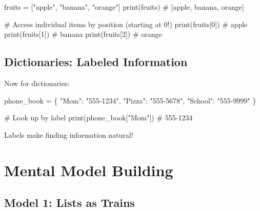 \documentclass[
  letterpaper,
  DIV=11,
  numbers=noendperiod,
  oneside]{scrreprt}
\newenvironment{Shaded}{}{}
\newcommand{\BuiltInTok}[1]{\textcolor[rgb]{0.84,0.23,0.29}{#1}}
\newcommand{\CommentTok}[1]{\textcolor[rgb]{0.42,0.45,0.49}{#1}}
\newcommand{\DecValTok}[1]{\textcolor[rgb]{0.00,0.36,0.77}{#1}}
\newcommand{\NormalTok}[1]{\textcolor[rgb]{0.14,0.16,0.18}{#1}}
\newcommand{\OperatorTok}[1]{\textcolor[rgb]{0.14,0.16,0.18}{#1}}
\newcommand{\StringTok}[1]{\textcolor[rgb]{0.01,0.18,0.38}{#1}}
\begin{document}
\begin{Shaded}
\begin{Highlighting}[]
\NormalTok{fruits }\OperatorTok{=}\NormalTok{ [}\StringTok{"apple"}\NormalTok{, }\StringTok{"banana"}\NormalTok{, }\StringTok{"orange"}\NormalTok{]}
\BuiltInTok{print}\NormalTok{(fruits)  }\CommentTok{\# [\textquotesingle{}apple\textquotesingle{}, \textquotesingle{}banana\textquotesingle{}, \textquotesingle{}orange\textquotesingle{}]}

\CommentTok{\# Access individual items by position (starting at 0!)}
\BuiltInTok{print}\NormalTok{(fruits[}\DecValTok{0}\NormalTok{])  }\CommentTok{\# apple}
\BuiltInTok{print}\NormalTok{(fruits[}\DecValTok{1}\NormalTok{])  }\CommentTok{\# banana}
\BuiltInTok{print}\NormalTok{(fruits[}\DecValTok{2}\NormalTok{])  }\CommentTok{\# orange}
\end{Highlighting}
\end{Shaded}

\subsection{Dictionaries: Labeled
Information}\label{dictionaries-labeled-information}

Now for dictionaries:

\begin{Shaded}
\begin{Highlighting}[]
\NormalTok{phone\_book }\OperatorTok{=}\NormalTok{ \{}
    \StringTok{"Mom"}\NormalTok{: }\StringTok{"555{-}1234"}\NormalTok{,}
    \StringTok{"Pizza"}\NormalTok{: }\StringTok{"555{-}5678"}\NormalTok{,}
    \StringTok{"School"}\NormalTok{: }\StringTok{"555{-}9999"}
\NormalTok{\}}

\CommentTok{\# Look up by label}
\BuiltInTok{print}\NormalTok{(phone\_book[}\StringTok{"Mom"}\NormalTok{])  }\CommentTok{\# 555{-}1234}
\end{Highlighting}
\end{Shaded}

Labels make finding information natural!

\section{Mental Model Building}\label{mental-model-building-6}

\subsection{Model 1: Lists as Trains}\label{model-1-lists-as-trains}
\end{document}
